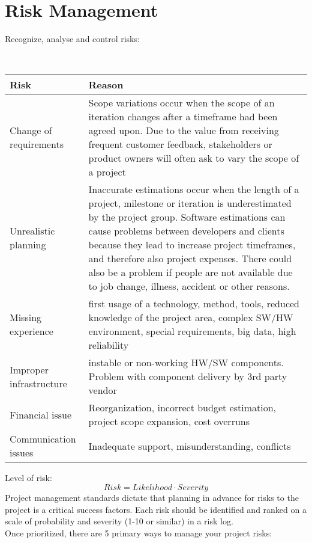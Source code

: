 \newpage
\section{Risk Management}
Recognize, analyse and control risks:
\ifslides
\\{\footnotesize
\else
\\[2ex]
\fi
\begin{tabular}{|l|p{8.5cm}|}
\hline
Risk & Reason \\
\hline
Change of requirements & Scope variations occur when the scope of an iteration
  changes after a timeframe had been agreed upon. Due to the value from
  receiving frequent customer feedback, stakeholders or product owners
  will often ask to vary the scope of a project\\
\hline
Unrealistic planning & Inaccurate estimations occur when the length of a
  project, milestone or iteration is underestimated by the project group.
  Software estimations can cause problems between developers and clients
  because they lead to increase project timeframes, and therefore also
  project expenses. There could also be a problem if people are not
  available due to job change, illness, accident or other reasons.\\
\hline
Missing experience & first usage of a technology, method, tools,
  reduced knowledge of the project area,
  complex SW/HW environment, special requirements, big data,
  high reliability\\
\hline
Improper infrastructure & instable or non-working HW/SW components. Problem with
  component delivery by 3rd party vendor\\
\hline
Financial issue      & Reorganization, incorrect budget estimation,
  project scope expansion, cost overruns\\
\hline
Communication issues & Inadequate support, misunderstanding, conflicts\\
\hline
\end{tabular}
\ifslides
}
\fi
\vspace{0.5cm}

Level of risk:
\begin{equation}
  Risk = Likelihood \cdot Severity
\end{equation}
Project management standards dictate that planning in advance for risks to
the project is a critical success factors.  Each risk should be identified
and ranked on a scale of probability and severity (1-10 or similar) in a
risk log.\\
Once prioritized, there are 5 primary ways to manage your project risks:

